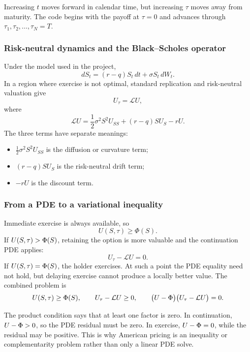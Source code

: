\begin{commonconfusion}
Increasing \(t\) moves forward in calendar time, but increasing \(\tau\) moves
away from maturity. The code begins with the payoff at \(\tau=0\) and advances
through \(\tau_1,\tau_2,\ldots,\tau_N=T\).
\end{commonconfusion}

\subsubsection{Risk-neutral dynamics and the Black--Scholes operator}
Under the model used in the project,
\[
  dS_t=(r-q)S_t\,dt+\sigma S_t\,dW_t.
\]
In a region where exercise is not optimal, standard replication and
risk-neutral valuation give
\[
  U_\tau=\mathcal{L}U,
\]
where
\[
  \mathcal{L}U
  =
  \frac12\sigma^2S^2U_{SS}
  +(r-q)SU_S-rU.
\]
The three terms have separate meanings:
\begin{itemize}
  \item \(\tfrac12\sigma^2S^2U_{SS}\) is the diffusion or curvature term;
  \item \((r-q)SU_S\) is the risk-neutral drift term;
  \item \(-rU\) is the discount term.
\end{itemize}

\subsubsection{From a PDE to a variational inequality}
Immediate exercise is always available, so
\[
  U(S,\tau)\geq\Phi(S).
\]
If \(U(S,\tau)>\Phi(S)\), retaining the option is more valuable and the
continuation PDE applies:
\[
  U_\tau-\mathcal{L}U=0.
\]
If \(U(S,\tau)=\Phi(S)\), the holder exercises. At such a point the PDE
equality need not hold, but delaying exercise cannot produce a locally better
value. The combined problem is
\[
  U(S,\tau)\geq\Phi(S),
  \qquad
  U_\tau-\mathcal{L}U\geq0,
  \qquad
  \bigl(U-\Phi\bigr)
  \bigl(U_\tau-\mathcal{L}U\bigr)=0.
\]

\begin{readerintuition}
The product condition says that at least one factor is zero. In continuation,
\(U-\Phi>0\), so the PDE residual must be zero. In exercise,
\(U-\Phi=0\), while the residual may be positive. This is why American
pricing is an inequality or complementarity problem rather than only a linear
PDE solve.
\end{readerintuition}

